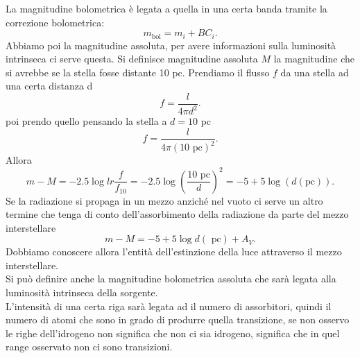 La magnitudine bolometrica è legata a quella in una certa banda tramite la correzione bolometrica:
\[
	m_{\text{bol}}= m_{i}+ BC_i
.\] 
Abbiamo poi la magnitudine assoluta, per avere informazioni sulla luminosità intrinseca ci serve questa.
Si definisce magnitudine assoluta $M$ la magnitudine che si avrebbe se la stella fosse distante 10 pc. Prendiamo il flusso $f$ da una stella ad una certa distanza d
\[
	f = \frac{l}{4\pi d^2}
.\] 
poi prendo quello pensando la stella a $d = 10$ pc
\[
	f = \frac{l}{4\pi \left( 10 \text{ pc} \right) ^2}
.\] 
Allora
\[
	m-M = -2.5 \log lr \frac{f}{f_{10}}= 
	-2.5 \log \left( \frac{10\text{ pc}}{d} \right) ^2 = 
	- 5 + 5  \log \left( d( \text{pc})  \right) 
.\] 
Se la radiazione si propaga in un mezzo anziché nel vuoto ci serve un altro termine che tenga di conto dell'assorbimento della radiazione da parte del mezzo interstellare
\[
	m-M = -5+5\log d( \text{ pc}) + A_{V}
.\] 
Dobbiamo conoscere allora l'entità dell'estinzione della luce attraverso il mezzo interstellare.\\
Si può definire anche la magnitudine bolometrica assoluta che sarà legata alla luminosità intrinseca della sorgente.\\
L'intensità di una certa riga sarà legata ad il numero di assorbitori, quindi il numero di atomi che sono in grado di produrre quella transizione, se non osservo le righe dell'idrogeno non significa che non ci sia idrogeno, significa che in quel range osservato non ci sono transizioni.

